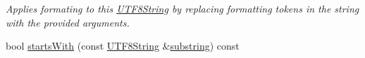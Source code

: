 \begin{DoxyCompactItemize}
\begin{DoxyCompactList}\small\item\em Applies formating to this \hyperlink{classchaos_1_1str_1_1_u_t_f8_string}{U\-T\-F8\-String} by replacing formatting tokens in the string with the provided arguments. \end{DoxyCompactList}\item 
\hypertarget{classchaos_1_1str_1_1_u_t_f8_string_a1c184c731e4fa232f8ed329d4a745e2b}{bool \hyperlink{classchaos_1_1str_1_1_u_t_f8_string_a1c184c731e4fa232f8ed329d4a745e2b}{starts\-With} (const \hyperlink{classchaos_1_1str_1_1_u_t_f8_string}{U\-T\-F8\-String} \&\hyperlink{classchaos_1_1str_1_1_u_t_f8_string_a2d50ab58715264ae175f521816bf670c}{substring}) const }\label{classchaos_1_1str_1_1_u_t_f8_string_a1c184c731e4fa232f8ed329d4a745e2b}


\end{DoxyCompactItemize}
